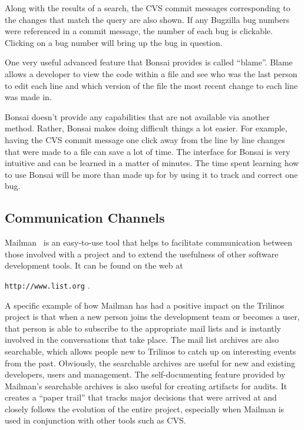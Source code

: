 \documentclass[12pt,relax]{article}
\newcommand{\InlineDirectory}[1]{
  {\hspace{0.01 in}} {\tt #1} {\hspace{0.01 in}}}
\begin{document}
Along with the results of a search, the CVS commit messages corresponding to 
the changes that match the query are also shown.  If any Bugzilla bug numbers 
were referenced in a commit message, the number of each bug is clickable.  
Clicking on a bug number will bring up the bug in question.

One very useful advanced feature that Bonsai provides is called ``blame''.  
Blame allows a developer to view the code within a file and see who was the 
last person to edit each line and which version of the file 
the most recent change to each line was made in.

Bonsai doesn't 
provide any capabilities that are not available via another method.  
Rather, Bonsai makes doing difficult things a lot easier.
For example, having the CVS commit message one click away from the line 
by line changes that
were made to a file can save a lot of time.  
The interface for Bonsai is very intuitive and can be learned in a matter of 
minutes.  The time spent learning how to use Bonsai will be more than made up 
for by using it to track and correct one bug.

\subsection{Communication Channels}

Mailman~\cite{Mailman} is an easy-to-use tool that helps to facilitate 
communication between
those involved with a project and to extend the usefulness of other 
software development tools.  It can be found on the web at 
\InlineDirectory{http://www.list.org}.  

A specific example of how Mailman 
has had a positive impact on the Trilinos project is that when a new person
joins the development team or becomes a user, that person is able to 
subscribe to the appropriate mail lists and is instantly involved in the 
conversations that take place.  The mail list archives are also searchable, 
which allows people new to Trilinos to catch up on interesting events from the 
past.  Obviously, the searchable archives are useful for new and existing 
developers, users and management.  The self-documenting feature provided 
by Mailman's searchable archives is also useful for creating artifacts for 
audits.  It creates a ``paper trail'' that tracks major decisions that were 
arrived at and closely follows 
the evolution of the entire project, especially when Mailman is used in 
conjunction with other tools such as CVS.
\end{document}
